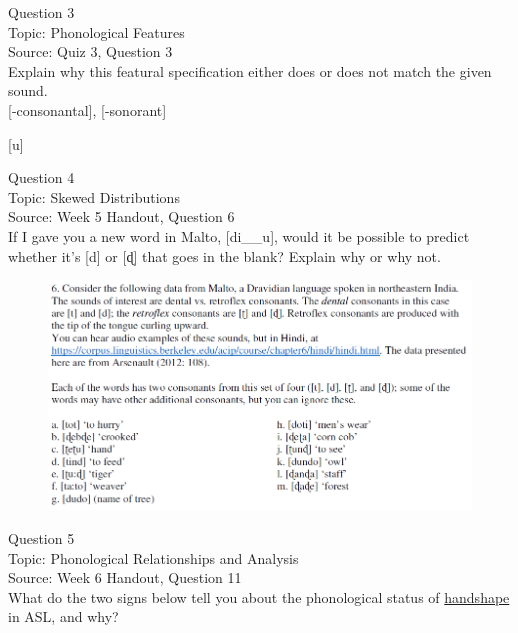\documentclass[12pt]{article}
\begin{document}
\newpage

{\large Question 3}\\

Topic: Phonological Features\\
Source: Quiz 3, Question 3\\

Explain why this featural specification either does or does not match the given sound.\\

{[-consonantal]}, {[-sonorant]}

{[u]}


\newpage

{\large Question 4}\\

Topic: Skewed Distributions\\
Source: Week 5 Handout, Question 6\\

If I gave you a new word in Malto, [di\_\_u], would it be possible to predict whether it's [d] or [ɖ] that goes in the blank? Explain why or why not.\\

\begin{figure}[H]
\includegraphics{../images/malto.png}
\end{figure}

\newpage

{\large Question 5}\\

Topic: Phonological Relationships and Analysis\\
Source: Week 6 Handout, Question 11\\

What do the two signs below tell you about the phonological status of \underline{handshape} in ASL, and why?\\
\end{document}
